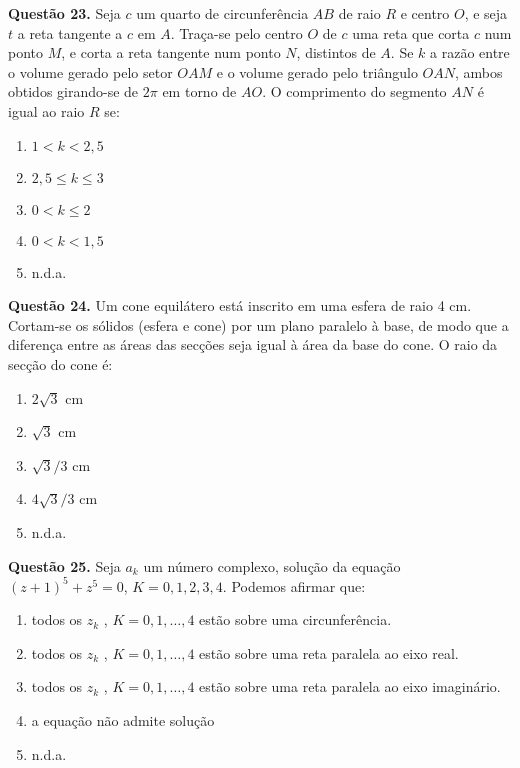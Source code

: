 \documentclass[11pt]{article}
\begin{document}
\textbf{Questão 23.} Seja  $c$  um  quarto  de  circunferência  $AB$  de  raio  $R$  e  centro $O$, e seja $t$ a reta tangente a $c$ em $A$. Traça-se pelo centro $O$ de $c$ uma reta que corta $c$ num ponto $M$, e corta a reta  tangente  num  ponto  $N$,  distintos  de  $A$.  Se  $k$  a  razão  entre  o  volume  gerado  pelo  setor  $OAM$  e  o  volume  gerado pelo triângulo $OAN$, ambos obtidos girando-se de $2\pi$  em torno de $AO$. O comprimento do segmento $AN$ é igual ao raio $R$ se:


\begin{multicols}{3}
    \begin{enumerate}[\bf A (\quad)]
        \item $1 < k < 2,5$
        \item $2,5 \leq k \leq 3 $
        \item $0 < k \leq 2$
        \item $0 < k < 1,5$
        \item n.d.a.
    \end{enumerate}
\end{multicols}

\textbf{Questão 24.} Um  cone  equilátero  está  inscrito  em  uma  esfera  de  raio  4  cm.  Cortam-se  os  sólidos  (esfera  e  cone)  por  um  plano  paralelo  à  base,  de  modo  que  a  diferença  entre  as  áreas das secções seja igual à área da base do cone. O raio da secção do cone é: 

\begin{multicols}{3}
    \begin{enumerate}[\bf A (\quad)]
        \item $2\sqrt{3}$ cm
        \item $\sqrt{3}$ cm
        \item $\sqrt{3} / 3$ cm
        \item $4\sqrt{3} / 3$ cm
        \item n.d.a.
    \end{enumerate}
\end{multicols}

\textbf{Questão 25.} Seja  $a_k$  um  número  complexo,  solução  da  equação $(z + 1)^5 + z^5 = 0$,  $K  =  0,  1,  2,  3,  4$.  Podemos  afirmar  que: 


\begin{enumerate}[\bf A (\quad)]
    \item todos   os   $z_k$   ,   $K   =   0,   1, \dots,   4$   estão   sobre   uma   circunferência.
    \item todos  os  $z_k$  ,  $K  =  0,  1, \dots,  4$  estão  sobre  uma  reta  paralela ao eixo real. 
    \item todos  os  $z_k$  ,  $K  =  0,  1, \dots,  4$  estão  sobre  uma  reta  paralela ao eixo imaginário. 
    \item a equação não admite solução
    \item n.d.a.
\end{enumerate}
\end{document}
